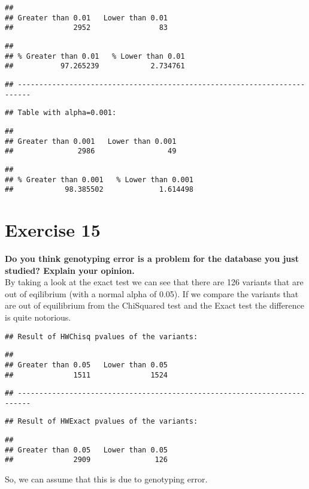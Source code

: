\documentclass[]{article}
\begin{document}
\begin{verbatim}
## 
## Greater than 0.01   Lower than 0.01 
##              2952                83
\end{verbatim}

\begin{verbatim}
## 
## % Greater than 0.01   % Lower than 0.01 
##           97.265239            2.734761
\end{verbatim}

\begin{verbatim}
## -------------------------------------------------------------------------
\end{verbatim}

\begin{verbatim}
## Table with alpha=0.001:
\end{verbatim}

\begin{verbatim}
## 
## Greater than 0.001   Lower than 0.001 
##               2986                 49
\end{verbatim}

\begin{verbatim}
## 
## % Greater than 0.001   % Lower than 0.001 
##            98.385502             1.614498
\end{verbatim}

\section{Exercise 15}\label{exercise-15}

\textbf{Do you think genotyping error is a problem for the database you
just studied? Explain your opinion.}\\
By taking a look at the exact test we can see that there are 126
variants that are out of eqilibrium (with a normal alpha of 0.05). If we
compare the variants that are out of equilibrium from the ChiSquared
test and the Exact test the difference is quite notorious.

\begin{verbatim}
## Result of HWChisq pvalues of the variants:
\end{verbatim}

\begin{verbatim}
## 
## Greater than 0.05   Lower than 0.05 
##              1511              1524
\end{verbatim}

\begin{verbatim}
## -------------------------------------------------------------------------
\end{verbatim}

\begin{verbatim}
## Result of HWExact pvalues of the variants:
\end{verbatim}

\begin{verbatim}
## 
## Greater than 0.05   Lower than 0.05 
##              2909               126
\end{verbatim}

So, we can assume that this is due to genotyping error.
\end{document}

